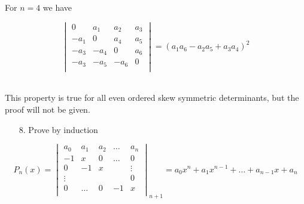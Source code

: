 \documentclass[11pt]{amsbook}
\begin{document}

\noindent For $n=4$ we have

\begin{equation*}
  \begin{vmatrix}
   0 & a_1 & a_2 & a_3 \\
    -a_1 & 0 & a_4 & a_5 \\
    -a_3 & -a_4 & 0 & a_6 \\
    -a_3 & -a_5 & -a_6 & 0 \\
  \end{vmatrix}
  = (a_1 a_6 - a_2 a_5 + a_3 a_4)^2
\end{equation*}\\

\par This property is true for all even ordered skew symmetric determinants, but the proof will not be given.
\newline

\begin{enumerate}
    \item [8.] Prove by induction
\end{enumerate}

\begin{equation*}
  P_n(x) = 
  \begin{vmatrix}
   a_0 & a_1 & a_2 & \dots & a_n \\
    -1 & x & 0 & \dots & 0 \\
    0 & -1 & x & & \vdots \\
    \vdots & & & & 0 \\
    0 & \dots & 0 & -1 & x \\
  \end{vmatrix}_{n+1}
  = a_0 x^n + a_1 x^{n-1} + \dots + a_{n-1} x + a_n
\end{equation*}
\end{document}

